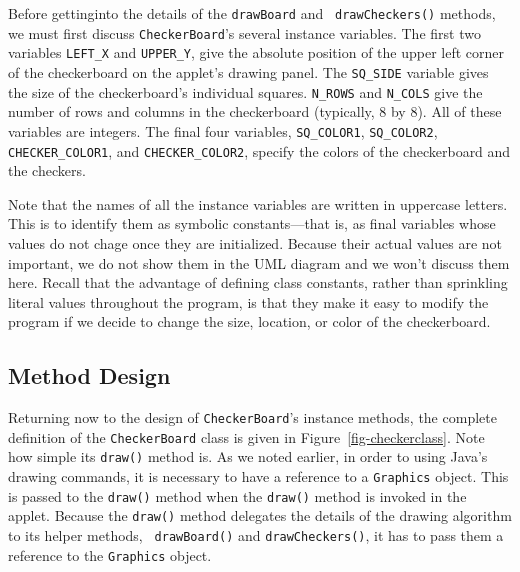 Before gettinginto the details of the {\tt drawBoard} and {\tt
drawCheckers()} methods, we must first discuss {\tt CheckerBoard}'s
several instance variables.  The first two variables {\tt LEFT\_X} and
{\tt UPPER\_Y}, give the absolute position of the upper left corner of
the checkerboard on the applet's drawing panel. The {\tt SQ\_SIDE}
variable gives the size of the checkerboard's individual squares.
{\tt N\_ROWS} and {\tt N\_COLS} give the number of rows and columns in
the checkerboard (typically, 8 by 8). All of these variables are
integers.  The final four variables, {\tt SQ\_COLOR1}, {\tt SQ\_COLOR2},
{\tt CHECKER\_COLOR1}, and {\tt CHECKER\_COLOR2}, specify the colors
of the checkerboard and the checkers. 

Note that the names of all the instance variables are written in
uppercase letters. This is to identify them as symbolic
constants---that is, as final variables whose values do not chage once
they are initialized. Because their actual values are not important,
we do not show them in the UML diagram and we won't discuss them here.
Recall that the advantage of defining class constants, rather than
sprinkling literal values throughout the program, is that they make it
easy to modify the program if we decide to change the size, location,
or color of the checkerboard.

\subsection*{Method Design}
Returning now to the design of {\tt CheckerBoard}'s instance methods,
the complete definition of the {\tt CheckerBoard} class is given in
Figure~\ref{fig-checkerclass}. Note how simple its {\tt draw()} method
is.  As we noted earlier, in order to using Java's drawing commands,
it is necessary to have a reference to a {\tt Graphics} object. This
is passed to the {\tt draw()} method when the {\tt draw()} method is
invoked in the applet.  Because the {\tt draw()} method delegates the
details of the drawing algorithm to its helper methods, {\tt
drawBoard()} and {\tt drawCheckers()}, it has to pass them a reference
to the {\tt Graphics} object.

